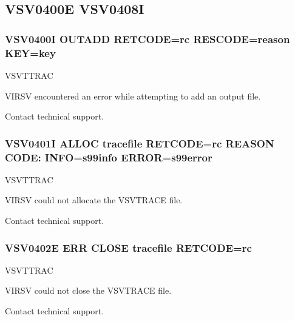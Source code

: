\documentclass[letterpaper,10pt,english]{sphinxmanual}
\begin{document}
\subsection{VSV0400E \sphinxhyphen{} VSV0408I}
\label{\detokenize{messages:vsv0400e-vsv0408i}}

\subsubsection{VSV0400I OUTADD RETCODE=rc RESCODE=reason KEY=key}
\label{\detokenize{messages:vsv0400i-outadd-retcode-rc-rescode-reason-key-key}}\begin{description}
\sphinxAtStartPar
VSVTTRAC

\sphinxAtStartPar
VIRSV encountered an error while attempting to add an output file.

\sphinxAtStartPar
Contact technical support.

\end{description}


\subsubsection{VSV0401I ALLOC tracefile RETCODE=rc REASON CODE: INFO=s99info ERROR=s99error}
\label{\detokenize{messages:vsv0401i-alloc-tracefile-retcode-rc-reason-code-info-s99info-error-s99error}}\begin{description}
\sphinxAtStartPar
VSVTTRAC

\sphinxAtStartPar
VIRSV could not allocate the VSVTRACE file.

\sphinxAtStartPar
Contact technical support.

\end{description}


\subsubsection{VSV0402E ERR CLOSE tracefile RETCODE=rc}
\label{\detokenize{messages:vsv0402e-err-close-tracefile-retcode-rc}}\begin{description}
\sphinxAtStartPar
VSVTTRAC

\sphinxAtStartPar
VIRSV could not close the VSVTRACE file.

\sphinxAtStartPar
Contact technical support.

\end{description}
\end{document}
